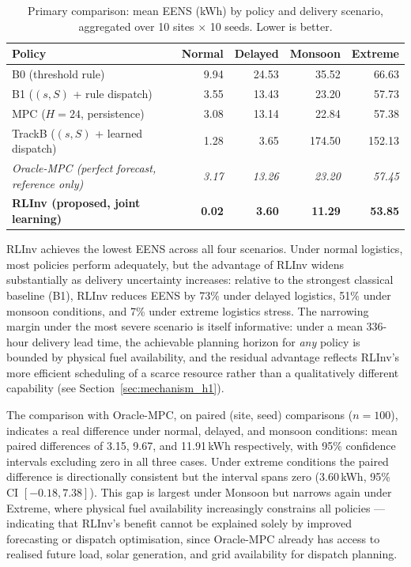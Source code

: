 \begin{table}[htb]
\centering
\small
\caption{Primary comparison: mean EENS (kWh) by policy and delivery
scenario, aggregated over 10 sites $\times$ 10 seeds. Lower is better.}
\label{tab:primary_comparison}
\begin{tabular}{p{5.2cm}rrrr}
\toprule
Policy & Normal & Delayed & Monsoon & Extreme \\
\midrule
B0 (threshold rule) & 9.94 & 24.53 & 35.52 & 66.63 \\
B1 ($(s,S)$ + rule dispatch) & 3.55 & 13.43 & 23.20 & 57.73 \\
MPC ($H{=}24$, persistence) & 3.08 & 13.14 & 22.84 & 57.38 \\
TrackB ($(s,S)$ + learned dispatch) & 1.28 & 3.65 & 174.50 & 152.13 \\
\midrule
\textit{Oracle-MPC (perfect forecast, reference only)} & \textit{3.17} & \textit{13.26} & \textit{23.20} & \textit{57.45} \\
\midrule
\textbf{RLInv (proposed, joint learning)} & \textbf{0.02} & \textbf{3.60} & \textbf{11.29} & \textbf{53.85} \\
\bottomrule
\end{tabular}
\end{table}

RLInv achieves the lowest EENS across all four scenarios. Under normal
logistics, most policies perform adequately, but the advantage of
RLInv widens substantially as delivery uncertainty increases: relative
to the strongest classical baseline (B1), RLInv reduces EENS by 73\%
under delayed logistics, 51\% under monsoon conditions, and 7\% under
extreme logistics stress. The narrowing margin under the most severe
scenario is itself informative: under a mean 336-hour delivery lead
time, the achievable planning horizon for \emph{any} policy is bounded
by physical fuel availability, and the residual advantage reflects
RLInv's more efficient scheduling of a scarce resource rather than a
qualitatively different capability (see Section~\ref{sec:mechanism_h1}).

The comparison with Oracle-MPC, on paired (site, seed) comparisons
($n{=}100$), indicates a real difference under normal, delayed, and
monsoon conditions: mean paired differences of 3.15, 9.67, and
11.91\,kWh respectively, with 95\% confidence intervals excluding zero
in all three cases. Under extreme conditions the paired difference is
directionally consistent but the interval spans zero (3.60\,kWh, 95\%
CI $[-0.18, 7.38]$). This gap is largest under
Monsoon but narrows again under Extreme, where physical fuel
availability increasingly constrains all policies --- indicating that RLInv's
benefit cannot be explained solely by improved forecasting or dispatch
optimisation, since Oracle-MPC already has access to realised future
load, solar generation, and grid availability for dispatch planning.

